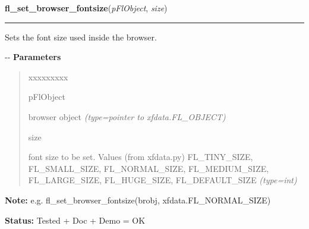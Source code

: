 \hspace{.8\funcindent}\begin{boxedminipage}{\funcwidth}

    \raggedright \textbf{fl\_set\_browser\_fontsize}(\textit{pFlObject}, \textit{size})

    \vspace{-1.5ex}

    \rule{\textwidth}{0.5\fboxrule}
\setlength{\parskip}{2ex}

Sets the font size used inside the browser.

-{}-
\setlength{\parskip}{1ex}
      \textbf{Parameters}
      \vspace{-1ex}

      \begin{quote}
        \begin{Ventry}{xxxxxxxxx}

          \item[pFlObject]


browser object
            {\it (type=pointer to xfdata.FL\_OBJECT)}

          \item[size]


font size to be set. Values (from xfdata.py) FL\_TINY\_SIZE,
FL\_SMALL\_SIZE, FL\_NORMAL\_SIZE, FL\_MEDIUM\_SIZE, FL\_LARGE\_SIZE,
FL\_HUGE\_SIZE, FL\_DEFAULT\_SIZE
            {\it (type=int)}

        \end{Ventry}

      \end{quote}

\textbf{Note:} 
e.g. fl\_set\_browser\_fontsize(brobj, xfdata.FL\_NORMAL\_SIZE)


\textbf{Status:} 
Tested + Doc + Demo = OK


    \end{boxedminipage}

    \label{xformslib:flbrowser:fl_set_browser_fontstyle}

    \vspace{0.5ex}

